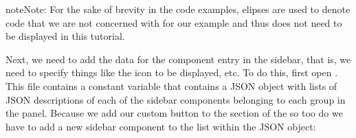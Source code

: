 \documentclass[letterpaper,10pt,english]{sphinxmanual}
\begin{document}
\begin{sphinxadmonition}{note}{Note:}
\sphinxAtStartPar
For the sake of brevity in the code examples, elipses are used to denote code that we are not concerned with for our example and thus does not need to be displayed in this tutorial.
\end{sphinxadmonition}

%
\begin{sphinxVerbatim}[commandchars=\\\{\},numbers=left,firstnumber=1,stepnumber=1]
\end{sphinxVerbatim}
\sphinxresetverbatimhllines

\sphinxAtStartPar
Next, we need to add the data for the component entry in the sidebar, that is, we need to specify things like the icon to be displayed, etc. To do this, first open . This file contains a constant variable  that contains a JSON object with lists of JSON descriptions of each of the sidebar components belonging to each group in the panel. Because we add our custom button to the  section of the  so too do we have to add a new sidebar component to the  list within the JSON object:
\end{document}
